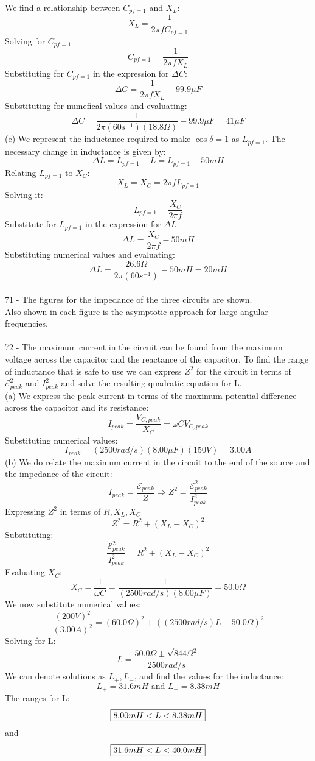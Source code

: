 \documentclass{report}
\begin{document}
We find a relationship between $C_{pf = 1}$ and $X_L$:
$$X_L = \frac{1}{2 \pi fC_{pf = 1}}$$
Solving for $C_{pf = 1}$
$$C_{pf = 1} = \frac{1}{2 \pi fX_L}$$
Substituting for $C_{pf = 1}$ in the expression for $\Delta C$:
$$\Delta C = \frac{1}{2 \pi fX_L} - 99.9 \mu F$$
Substituting for numefical values and evaluating:
$$\Delta C = \frac{1}{2 \pi (60s^{-1})(18.8 \Omega)} - 99.9 \mu F = 41 \mu F$$
(e) We represent the inductance required to make $\cos \delta = 1$ as $L_{pf = 1}$. The necessary change in inductance is given by:
$$\Delta L = L_{pf = 1} - L = L_{pf = 1} - 50 mH$$
Relating $L_{pf = 1}$ to $X_C$:
$$X_L = X_C = 2 \pi fL_{pf = 1}$$
Solving it:
$$L_{pf = 1} = \frac{X_C}{2 \pi f}$$
Substitute for $L_{pf = 1}$ in the expression for $\Delta L$:
$$\Delta L = \frac{X_C}{2 \pi f} - 50 mH$$
Substituting numerical values and evaluating:
$$\Delta L = \frac{26.6 \Omega}{2 \pi (60s^{-1})} - 50 mH = 20 mH$$

\paragraph{}
71 - The figures for the impedance of the three circuits are shown.\\
Also shown in each figure is the asymptotic approach for large angular frequencies.

\paragraph{}
72 - The maximum current in the circuit can be found from the maximum voltage across the capacitor and the reactance of the capacitor. To find the range of inductance that is safe to use we can express $Z^2$ for the circuit in terms of $\mathcal{E}_{peak}^2$ and $I_{peak}^2$ and solve the resulting quadratic equation for L.\\
(a) We express the peak current in terms of the maximum potential difference across the capacitor and its resistance:
$$I_{peak} = \frac{V_{C, peak}}{X_C} = \omega CV_{C, peak}$$
Substituting numerical values:
$$I_{peak} = (2500 rad / s)(8.00 \mu F)(150 V) = 3.00 A$$
(b) We do relate the maximum current in the circuit to the emf of the source and the impedance of the circuit:
$$I_{peak} = \frac{\mathcal{E}_{peak}}{Z} \Rightarrow Z^2 = \frac{\mathcal{E}_{peak}^2}{I_{peak}^2}$$
Expressing $Z^2$ in terms of $R, X_L, X_C$
$$Z^2 = R^2 + (X_L - X_C)^2$$
Substituting:
$$\frac{\mathcal{E}_{peak}^2}{I_{peak}^2} = R^2 + (X_L - X_C)^2$$
Evaluating $X_C$:
$$X_C = \frac{1}{\omega C} = \frac{1}{(2500 rad / s)(8.00 \mu F)} = 50.0 \Omega$$
We now substitute numerical values:
$$\frac{(200 V)^2}{(3.00 A)^2} = (60.0 \Omega)^2 + ((2500 rad / s)L - 50.0 \Omega)^2$$
Solving for L:
$$L = \frac{50.0 \Omega \pm \sqrt{844 \Omega^2}}{2500 rad / s}$$
We can denote solutions as $L_{+}, L_{-}$, and find the values for the inductance:
$$L_{+} = 31.6 mH \text{ and } L_{-} = 8.38 mH$$
The ranges for L:
$$\fbox{$8.00 mH < L < 8.38 mH$}$$
and
$$\fbox{$31.6 mH < L < 40.0 mH$}$$
\end{document}
